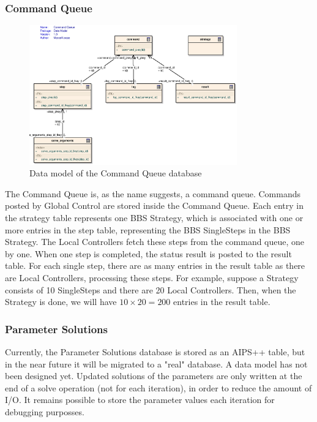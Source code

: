 \documentclass[10pt]{lofar}
\begin{document}
\subsubsection{Command Queue}
\label{subsubsec:design-command-queue}
\begin{figure}[!ht]
\includegraphics[width=0.8\textwidth]{images/command-queue-datamodel}
\caption{Data model of the Command Queue database}
\end{figure}
The Command Queue is, as the name suggests, a command queue. Commands posted
by Global Control are stored inside the Command Queue. Each entry in the
strategy table represents one BBS Strategy, which is associated with one or
more entries in the step table, representing the BBS SingleSteps in the BBS
Strategy. The Local Controllers fetch these steps from the command queue, one
by one. When one step is completed, the status result is posted to the result
table. For each single step, there are as many entries in the result table as
there are Local Controllers, processing these steps. For example, suppose a
Strategy consists of 10 SingleSteps and there are 20 Local Controllers. Then,
when the Strategy is done, we will have $10\times20=200$ entries in the result
table.

\subsubsection{Parameter Solutions}
\label{subsubsec:design-parameter-solutions}
Currently, the Parameter Solutions database is stored as an AIPS++ table, but
in the near future it will be migrated to a "real" database. A data model has
not been designed yet. Updated solutions of the parameters are only written at
the end of a solve operation (not for each iteration), in order to reduce the
amount of I/O. It remains possible to store the parameter values each iteration
for debugging purposses.
\end{document}

